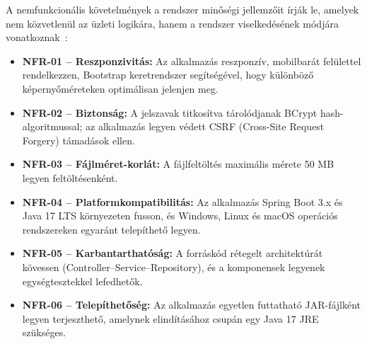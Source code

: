 A nemfunkcionális követelmények a rendszer minőségi jellemzőit írják le, amelyek nem közvetlenül az üzleti logikára, hanem a rendszer viselkedésének módjára vonatkoznak~\cite{chung2000nonfunctional}:

\begin{itemize}
    \item \textbf{NFR-01 – Reszponzivitás:} Az alkalmazás reszponzív, mobilbarát felülettel rendelkezzen, Bootstrap keretrendszer segítségével, hogy különböző képernyőméreteken optimálisan jelenjen meg.
    \item \textbf{NFR-02 – Biztonság:} A jelszavak titkosítva tárolódjanak BCrypt hash-algoritmussal; az alkalmazás legyen védett CSRF (Cross-Site Request Forgery) támadások ellen.
    \item \textbf{NFR-03 – Fájlméret-korlát:} A fájlfeltöltés maximális mérete 50 MB legyen feltöltésenként.
    \item \textbf{NFR-04 – Platformkompatibilitás:} Az alkalmazás Spring Boot 3.x és Java 17 LTS környezeten fusson, és Windows, Linux és macOS operációs rendszereken egyaránt telepíthető legyen.
    \item \textbf{NFR-05 – Karbantarthatóság:} A forráskód rétegelt architektúrát kövessen (Controller–Service–Repository), és a komponensek legyenek egységtesztekkel lefedhetők.
    \item \textbf{NFR-06 – Telepíthetőség:} Az alkalmazás egyetlen futtatható JAR-fájlként legyen terjeszthető, amelynek elindításához csupán egy Java 17 JRE szükséges.
\end{itemize}
